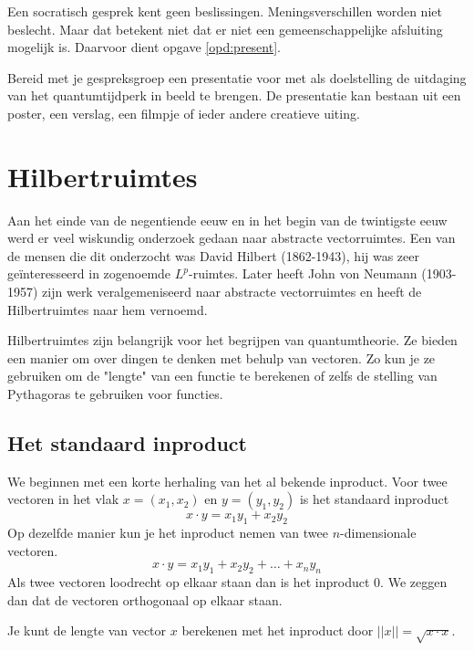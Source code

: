 \documentclass[../../main.tex]{subfiles}
\begin{document}
Een socratisch gesprek kent geen beslissingen. Meningsverschillen worden niet beslecht. Maar dat betekent niet dat er niet een gemeenschappelijke afsluiting mogelijk is. Daarvoor dient opgave \ref{opd:present}.

\begin{opdracht}\label{opd:present}
Bereid met je gespreksgroep een presentatie voor met als doelstelling de uitdaging van het quantumtijdperk in beeld te brengen. De presentatie kan bestaan uit een poster, een verslag, een filmpje  of ieder andere creatieve uiting.
\end{opdracht}


\section{Hilbertruimtes}\label{sec:POHilbert}
Aan het einde van de negentiende eeuw en in het begin van de twintigste eeuw werd er veel wiskundig onderzoek gedaan naar abstracte vectorruimtes. Een van de mensen die dit onderzocht was David Hilbert (1862-1943), hij was zeer geïnteresseerd in zogenoemde $L^p$-ruimtes. Later heeft John von Neumann (1903-1957) zijn werk veralgemeniseerd naar abstracte vectorruimtes en heeft de Hilbertruimtes naar hem vernoemd.

Hilbertruimtes zijn belangrijk voor het begrijpen van quantumtheorie. Ze bieden een manier om over dingen te denken met behulp van vectoren. Zo kun je ze gebruiken om de "lengte" van een functie te berekenen of zelfs de stelling van Pythagoras te gebruiken voor functies.


\subsection*{Het standaard inproduct}
We beginnen met een korte herhaling van het al bekende inproduct. 
Voor twee vectoren in het vlak $x=(x_1,x_2)$ en $y=(y_1,y_2)$ is het standaard inproduct
\[x\cdot y =x_1y_1+x_2y_2\]
Op dezelfde manier kun je het inproduct nemen van twee $n$-dimensionale vectoren.
\[x\cdot y=x_1y_1+x_2y_2+\ldots+x_ny_n\]
Als twee vectoren loodrecht op elkaar staan dan is het inproduct 0. We zeggen dan dat de vectoren orthogonaal op elkaar staan.

Je kunt de lengte van vector $x$ berekenen met het inproduct door $||x||=\sqrt{x\cdot x}$.
\end{document}
